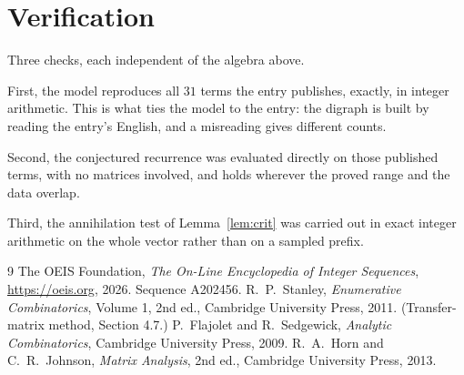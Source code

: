 \documentclass[11pt,a4paper]{article}
\theoremstyle{plain}
\theoremstyle{definition}
\begin{document}
\section{Verification}

Three checks, each independent of the algebra above.

First, the model reproduces all $31$ terms the entry publishes, exactly, in integer
arithmetic. This is what ties the model to the entry: the digraph is built by reading the
entry's English, and a misreading gives different counts.

Second, the conjectured recurrence was evaluated directly on those published terms, with no
matrices involved, and holds wherever the proved range and the data overlap.

Third, the annihilation test of Lemma~\ref{lem:crit} was carried out in exact integer
arithmetic on the whole vector rather than on a sampled prefix.

\begin{thebibliography}{9}
 The OEIS Foundation, \emph{The On-Line Encyclopedia of Integer
Sequences}, \url{https://oeis.org}, 2026. Sequence A202456.
 R.~P.~Stanley, \emph{Enumerative Combinatorics}, Volume 1, 2nd ed.,
Cambridge University Press, 2011. (Transfer-matrix method, Section 4.7.)
 P.~Flajolet and R.~Sedgewick, \emph{Analytic Combinatorics}, Cambridge
University Press, 2009.
 R.~A.~Horn and C.~R.~Johnson, \emph{Matrix Analysis}, 2nd ed., Cambridge
University Press, 2013.
\end{thebibliography}
\end{document}
